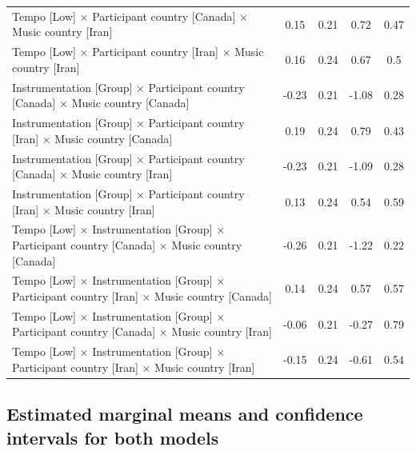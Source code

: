 \documentclass[
  bookmarksnumbered]{article}
\begin{document}
\begin{table}[H]
{\begin{tabular}[t]{lcccc}
\hspace{1em}Tempo [Low] × Participant country [Canada] × Music country [Iran] & 0.15 & 0.21 & 0.72 & 0.47\\
\hspace{1em}Tempo [Low] × Participant country [Iran] × Music country [Iran] & 0.16 & 0.24 & 0.67 & 0.5\\
\hspace{1em}Instrumentation [Group] × Participant country [Canada] × Music country [Canada] & -0.23 & 0.21 & -1.08 & 0.28\\
\hspace{1em}Instrumentation [Group] × Participant country [Iran] × Music country [Canada] & 0.19 & 0.24 & 0.79 & 0.43\\
\hspace{1em}Instrumentation [Group] × Participant country [Canada] × Music country [Iran] & -0.23 & 0.21 & -1.09 & 0.28\\
\hspace{1em}Instrumentation [Group] × Participant country [Iran] × Music country [Iran] & 0.13 & 0.24 & 0.54 & 0.59\\
\hspace{1em}Tempo [Low] × Instrumentation [Group] × Participant country [Canada] × Music country [Canada] & -0.26 & 0.21 & -1.22 & 0.22\\
\hspace{1em}Tempo [Low] × Instrumentation [Group] × Participant country [Iran] × Music country [Canada] & 0.14 & 0.24 & 0.57 & 0.57\\
\hspace{1em}Tempo [Low] × Instrumentation [Group] × Participant country [Canada] × Music country [Iran] & -0.06 & 0.21 & -0.27 & 0.79\\
\hspace{1em}Tempo [Low] × Instrumentation [Group] × Participant country [Iran] × Music country [Iran] & -0.15 & 0.24 & -0.61 & 0.54\\
\bottomrule
\end{tabular}}
\end{table}

\hypertarget{estimated-marginal-means-and-confidence-intervals-for-both-models}{%
\subsection{Estimated marginal means and confidence intervals for both models}\label{estimated-marginal-means-and-confidence-intervals-for-both-models}}
\end{document}
